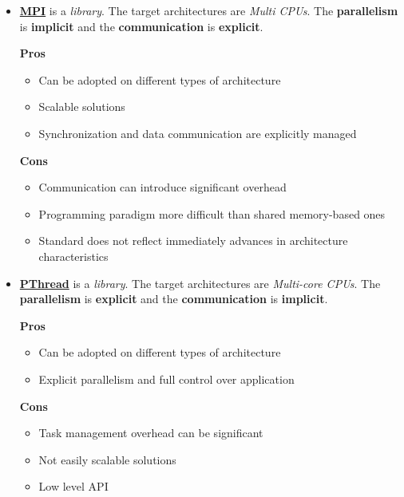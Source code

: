 \begin{itemize}
    \item \textbf{\underline{MPI}} is a \emph{library}. The target architectures are \emph{Multi CPUs}. The \textbf{parallelism} is \textbf{implicit} and the \textbf{communication} is \textbf{explicit}.
    \begin{flushleft}
        \textcolor{Green3}{ \textbf{Pros}}
    \end{flushleft}
    \begin{itemize}
        \item Can be adopted on different types of architecture
        \item Scalable solutions
        \item Synchronization and data communication are explicitly managed
    \end{itemize}
    \begin{flushleft}
        \textcolor{Red2}{ \textbf{Cons}}
    \end{flushleft}
    \begin{itemize}
        \item Communication can introduce significant overhead
        \item Programming paradigm more difficult than shared memory-based ones
        \item Standard does not reflect immediately advances in architecture characteristics
    \end{itemize}

    \item \textbf{\underline{PThread}} is a \emph{library}. The target architectures are \emph{Multi-core CPUs}. The \textbf{parallelism} is \textbf{explicit} and the \textbf{communication} is \textbf{implicit}.
    \begin{flushleft}
        \textcolor{Green3}{ \textbf{Pros}}
    \end{flushleft}
    \begin{itemize}
        \item Can be adopted on different types of architecture
        \item Explicit parallelism and full control over application
    \end{itemize}
    \begin{flushleft}
        \textcolor{Red2}{ \textbf{Cons}}
    \end{flushleft}
    \begin{itemize}
        \item Task management overhead can be significant
        \item Not easily scalable solutions
        \item Low level API
    \end{itemize}


\end{itemize}
